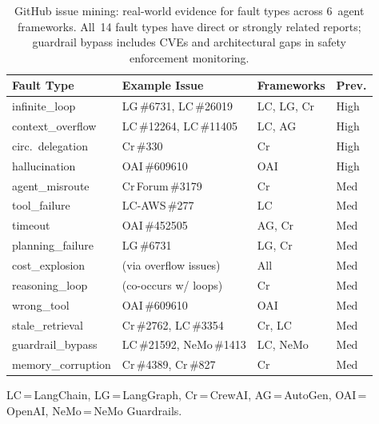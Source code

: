 \documentclass[sigplan,10pt,screen]{acmart}
\begin{document}
\begin{table}[t]
\centering
\small
\caption{GitHub issue mining: real-world evidence for fault types across
6~agent frameworks.  All~14 fault types have direct or strongly related
reports; guardrail bypass includes CVEs and architectural gaps in safety
enforcement monitoring.}
\label{tab:github-mining}
\begin{tabular}{@{}llll@{}}
\toprule
\textbf{Fault Type} & \textbf{Example Issue} & \textbf{Frameworks} & \textbf{Prev.} \\
\midrule
infinite\_loop       & LG\,\#6731, LC\,\#26019  & LC, LG, Cr     & High \\
context\_overflow    & LC\,\#12264, LC\,\#11405  & LC, AG         & High \\
circ.\ delegation   & Cr\,\#330                 & Cr             & High \\
hallucination        & OAI\,\#609610             & OAI            & High \\
agent\_misroute     & Cr\,Forum\,\#3179         & Cr             & Med \\
tool\_failure       & LC-AWS\,\#277             & LC             & Med \\
timeout             & OAI\,\#452505             & AG, Cr         & Med \\
planning\_failure   & LG\,\#6731                & LG, Cr         & Med \\
cost\_explosion     & (via overflow issues)      & All            & Med \\
reasoning\_loop     & (co-occurs w/ loops)       & Cr             & Med \\
wrong\_tool         & OAI\,\#609610             & OAI            & Med \\
stale\_retrieval    & Cr\,\#2762, LC\,\#3354    & Cr, LC         & Med \\
guardrail\_bypass   & LC\,\#21592, NeMo\,\#1413 & LC, NeMo       & Med \\
memory\_corruption  & Cr\,\#4389, Cr\,\#827     & Cr             & Med \\
\bottomrule
\end{tabular}
\par\smallskip\noindent\footnotesize
LC\,=\,LangChain, LG\,=\,LangGraph, Cr\,=\,CrewAI, AG\,=\,AutoGen,
OAI\,=\,OpenAI, NeMo\,=\,NeMo Guardrails.
\end{table}
\end{document}
